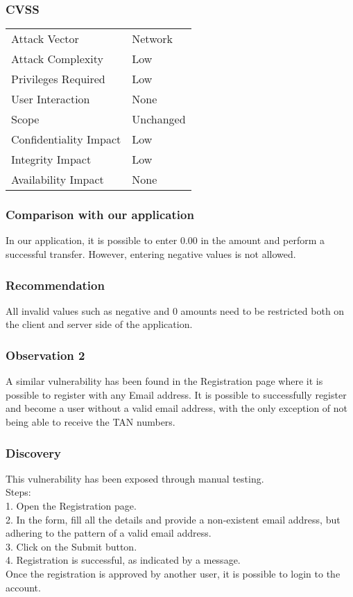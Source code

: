 \subsubsection{CVSS}
\begin{tabular}{l | l}
Attack Vector		& Network \\
Attack Complexity	& Low \\
Privileges Required & Low \\
User Interaction	& None \\
Scope				& Unchanged \\
Confidentiality Impact		& Low \\
Integrity Impact			& Low \\
Availability Impact		& None
\end{tabular}

\subsubsection{Comparison with our application}
In our application, it is possible to enter 0.00 in the amount and perform a successful transfer. However, entering negative values is not allowed.

\subsubsection{Recommendation}
All invalid values such as negative and 0 amounts need to be restricted both on the client and server side of the application.

\subsubsection{Observation 2}
A similar vulnerability has been found in the Registration page where it is possible to register with any Email address. It is possible to successfully register and become a user without a valid email address, with the only exception of not being able to receive the TAN numbers.

\subsubsection{Discovery}
This vulnerability has been exposed through manual testing.\\
Steps: \\
1. Open the Registration page. \\
2. In the form, fill all the details and provide a non-existent email address, but adhering to the pattern of a valid email address. \\
3. Click on the Submit button. \\
4. Registration is successful, as indicated by a message. \\
Once the registration is approved by another user, it is possible to login to the account.

